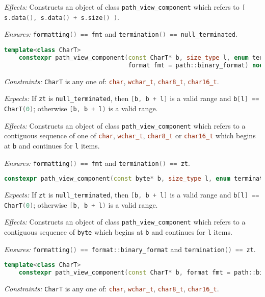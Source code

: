 \documentclass[11pt]{article}
\newcommand{\code}[2][cpp]{\lstinline[language=#1,basicstyle=\small\ttfamily]{#2}}
\newcommand{\desc}[1]{\textit{#1}}
\newcommand{\constraints}{\desc{Constraints: }}
\newcommand{\effects}{\desc{Effects: }}
\newcommand{\expects}{\desc{Expects: }}
\newcommand{\ensures}{\desc{Ensures: }}
\begin{document}
\effects Constructs an object of class \code{path_view_component} which refers to \code{[ s.data(), s.data() + s.size() )}.

\ensures \code{formatting() == fmt} and \code{termination() == null_terminated}.\\

\begin{lstlisting}[language=cpp]
    template<class CharT>
    constexpr path_view_component(const CharT* b, size_type l, enum termination zt,
                                  format fmt = path::binary_format) noexcept;
\end{lstlisting}
\constraints \code{CharT} is any one of: \code{char}, \code{wchar_t}, \code{char8_t}, \code{char16_t}.

\expects If \code{zt} is \code{null_terminated}, then \code{[b, b + l]} is a valid range and \code{b[l] == CharT(0)}; otherwise \code{[b, b + l)} is a valid range.

\effects Constructs an object of class \code{path_view_component} which refers to a contiguous sequence of one of \code{char}, \code{wchar_t}, \code{char8_t} or \code{char16_t} which begins at \code{b} and continues for \code{l} items.

\ensures \code{formatting() == fmt} and \code{termination() == zt}.\\

\begin{lstlisting}[language=cpp]
    constexpr path_view_component(const byte* b, size_type l, enum termination zt) noexcept;
\end{lstlisting}

\expects If \code{zt} is \code{null_terminated}, then \code{[b, b + l]} is a valid range and \code{b[l] == CharT(0)}; otherwise \code{[b, b + l)} is a valid range.

\effects Constructs an object of class \code{path_view_component} which refers to a contiguous sequence of \code{byte} which begins at \code{b} and continues for \code{l} items.

\ensures \code{formatting() == format::binary_format} and \code{termination() == zt}.\\


\begin{lstlisting}[language=cpp]
    template<class CharT>
    constexpr path_view_component(const CharT* b, format fmt = path::binary_format) noexcept;
\end{lstlisting}
\constraints \code{CharT} is any one of: \code{char}, \code{wchar_t}, \code{char8_t}, \code{char16_t}.
\end{document}
